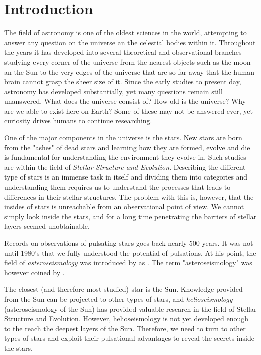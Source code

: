 \chapter{Introduction}

The field of astronomy is one of the oldest sciences in the world, attempting to answer any question on the universe an the celestial bodies within it. Throughout the years it has developed into several theoretical and observational branches studying every corner of the universe from the nearest objects such as the moon an the Sun to the very edges of the universe that are so far away that the human brain cannot grasp the sheer size of it. Since the early studies to present day, astronomy has developed substantially, yet many questions remain still unanswered. What does the universe consist of? How old is the universe? Why are we able to exist here on Earth? Some of these may not be answered ever, yet curiosity drives humans to continue researching. 

One of the major components in the universe is the stars. New stars are born from the "ashes" of dead stars and learning how they are formed, evolve and die is fundamental for understanding the environment they evolve in. Such studies are within the field of \textit{Stellar Structure and Evolution}. Describing the different type of stars is an immense task in itself and dividing them into categories and understanding them requires us to understand the processes that leads to differences in their stellar structures. The problem with this is, however, that the insides of stars is unreachable from an observational point of view. We cannot simply look inside the stars, and for a long time penetrating the barriers of stellar layers seemed unobtainable.

Records on observations of pulsating stars goes back nearly 500 years. It was not until 1980's that we fully understood the potential of pulsations. At his point, the field of \textit{asteroseismology} was introduced by \citet{christensen1984} as    
. The term "asteroseismology" was however coined by \citet{gough1996astereoasteroseismology}. 

The closest (and therefore most studied) star is the Sun. Knowledge provided from the Sun can be projected to other types of stars, and \textit{helioseismology} (asteroseismology of the Sun) has provided valuable research in the field of Stellar Structure and Evolution. However, helioseismology is not yet developed enough to the reach the deepest layers of the Sun. Therefore, we need to turn to other types of stars and exploit their pulsational advantages to reveal the secrets inside the stars. 

